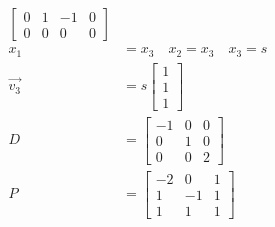 \documentclass{math}
\begin{document}
\begin{align*}
\begin{bmatrix}
    0 & 1 & -1 & 0 \\
    0 & 0 & 0 & 0
  \end{bmatrix} \\
  x_1 &= x_3 \quad x_2 = x_3 \quad x_3 = s \\
  \vec{v_3} &= s\begin{bmatrix}1 \\ 1 \\ 1\end{bmatrix} \\
  D &= \begin{bmatrix}
    -1 & 0 & 0 \\
    0 & 1 & 0 \\
    0 & 0 & 2
  \end{bmatrix} \\
  P &= \begin{bmatrix}
    -2 & 0 & 1 \\
    1 & -1 & 1 \\
    1 & 1 & 1
  \end{bmatrix}
\end{align*}
\end{document}
